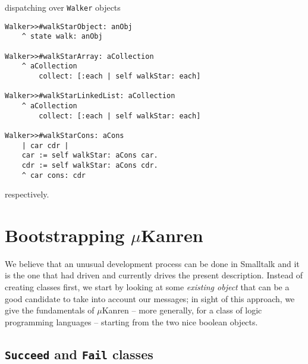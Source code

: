 \documentclass[a4paper,12pt]{article}
\begin{document}
dispatching over \Verb|Walker| objects
\begin{verbatim}
Walker>>#walkStarObject: anObj 
    ^ state walk: anObj

Walker>>#walkStarArray: aCollection 
    ^ aCollection
        collect: [:each | self walkStar: each]

Walker>>#walkStarLinkedList: aCollection 
    ^ aCollection
        collect: [:each | self walkStar: each] 

Walker>>#walkStarCons: aCons 
    | car cdr |
    car := self walkStar: aCons car.
    cdr := self walkStar: aCons cdr.
    ^ car cons: cdr 
\end{verbatim}
respectively.

\section{Bootstrapping $\mu$Kanren}

We believe that an unusual development process can be done in Smalltalk and it
is the one that had driven and currently drives the present description.
Instead of creating classes first, we start by looking at some \textit{existing
object} that can be a good candidate to take into account our messages; in
sight of this approach, we give the fundamentals of $\mu$Kanren -- more
generally, for a class of logic programming languages -- starting from the two
nice boolean objects.

\subsection{\texttt{Succeed} and \texttt{Fail} classes}
\end{document}
